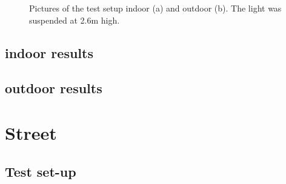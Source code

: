 \begin{figure}
	\centering     %
	\label{fig:TestPicture}
	\caption{Pictures of the test setup indoor (a) and outdoor (b). The light was suspended at 2.6m high.}
\end{figure}

\subsection{indoor results}

\subsection{outdoor results}

\section{Street}

\subsection{Test set-up}